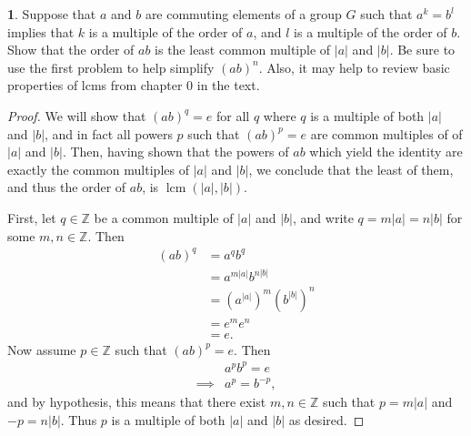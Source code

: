 \documentclass[12pt]{article}
\DeclareMathOperator{\lcm}{lcm}
\theoremstyle{definition}
\newtheorem{ex}{}
\begin{document}
\begin{ex}
	Suppose that $a$ and $b$ are commuting elements of a group $G$ such that $a^k = b^l$ implies that $k$ is a multiple of the order of $a$, and $l$ is a multiple of the order of $b$.
	Show that the order of $ab$ is the least common multiple of $|a|$ and $|b|$.
	Be sure to use the first problem to help simplify $(ab)^n$.
	Also, it may help to review basic properties of lcms from chapter 0 in the text.
\end{ex}
\begin{proof}
	We will show that $(ab)^{q} = e$ for all $q$ where $q$ is a multiple of both $|a|$ and $|b|$, and in fact all powers $p$ such that $(ab)^p = e$ are common multiples of of $|a|$ and $|b|$.
	Then, having shown that the powers of $ab$ which yield the identity are exactly the common multiples of $|a|$ and $|b|$, we conclude that the least of them, and thus the order of $ab$, is $\lcm (|a|, |b|)$.

	First, let $q \in \mathbb{Z}$ be a common multiple of $|a|$ and $|b|$, and write $q = m|a| = n|b|$ for some $m, n \in \mathbb{Z}$.
	Then \begin{align*}
		(ab)^{q} & = a^{q}b^{q}                                        \\
		         & = a^{m|a|}b^{n|b|}                                  \\
		         & = \left( a^{|a|} \right)^m \left( b^{|b|} \right)^n \\
		         & = e^me^n                                            \\
		         & = e.
	\end{align*}
	Now assume $p \in \mathbb{Z}$ such that $(ab)^p = e$.
	Then \begin{align*}
		         & a^pb^p = e    \\
		\implies & a^p = b^{-p},
	\end{align*}
	and by hypothesis, this means that there exist $m, n \in \mathbb{Z}$ such that $p = m|a|$ and $-p = n|b|$.
	Thus $p$ is a multiple of both $|a|$ and $|b|$ as desired.

\end{proof}
\end{document}
